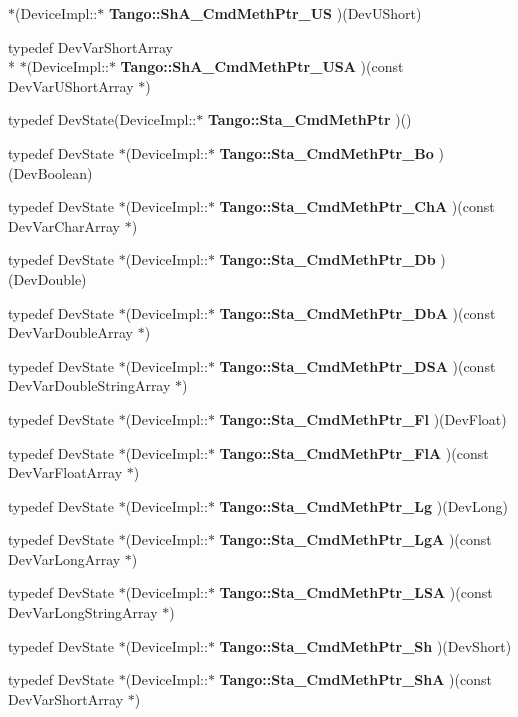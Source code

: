 \begin{DoxyCompactItemize}
$\ast$(Device\-Impl\-::$\ast$ {\bf Tango\-::\-Sh\-A\-\_\-\-Cmd\-Meth\-Ptr\-\_\-\-U\-S} )(Dev\-U\-Short)
\item 
typedef Dev\-Var\-Short\-Array \\*
$\ast$(Device\-Impl\-::$\ast$ {\bf Tango\-::\-Sh\-A\-\_\-\-Cmd\-Meth\-Ptr\-\_\-\-U\-S\-A} )(const Dev\-Var\-U\-Short\-Array $\ast$)
\item 
typedef Dev\-State(Device\-Impl\-::$\ast$ {\bf Tango\-::\-Sta\-\_\-\-Cmd\-Meth\-Ptr} )()
\item 
typedef Dev\-State $\ast$(Device\-Impl\-::$\ast$ {\bf Tango\-::\-Sta\-\_\-\-Cmd\-Meth\-Ptr\-\_\-\-Bo} )(Dev\-Boolean)
\item 
typedef Dev\-State $\ast$(Device\-Impl\-::$\ast$ {\bf Tango\-::\-Sta\-\_\-\-Cmd\-Meth\-Ptr\-\_\-\-Ch\-A} )(const Dev\-Var\-Char\-Array $\ast$)
\item 
typedef Dev\-State $\ast$(Device\-Impl\-::$\ast$ {\bf Tango\-::\-Sta\-\_\-\-Cmd\-Meth\-Ptr\-\_\-\-Db} )(Dev\-Double)
\item 
typedef Dev\-State $\ast$(Device\-Impl\-::$\ast$ {\bf Tango\-::\-Sta\-\_\-\-Cmd\-Meth\-Ptr\-\_\-\-Db\-A} )(const Dev\-Var\-Double\-Array $\ast$)
\item 
typedef Dev\-State $\ast$(Device\-Impl\-::$\ast$ {\bf Tango\-::\-Sta\-\_\-\-Cmd\-Meth\-Ptr\-\_\-\-D\-S\-A} )(const Dev\-Var\-Double\-String\-Array $\ast$)
\item 
typedef Dev\-State $\ast$(Device\-Impl\-::$\ast$ {\bf Tango\-::\-Sta\-\_\-\-Cmd\-Meth\-Ptr\-\_\-\-Fl} )(Dev\-Float)
\item 
typedef Dev\-State $\ast$(Device\-Impl\-::$\ast$ {\bf Tango\-::\-Sta\-\_\-\-Cmd\-Meth\-Ptr\-\_\-\-Fl\-A} )(const Dev\-Var\-Float\-Array $\ast$)
\item 
typedef Dev\-State $\ast$(Device\-Impl\-::$\ast$ {\bf Tango\-::\-Sta\-\_\-\-Cmd\-Meth\-Ptr\-\_\-\-Lg} )(Dev\-Long)
\item 
typedef Dev\-State $\ast$(Device\-Impl\-::$\ast$ {\bf Tango\-::\-Sta\-\_\-\-Cmd\-Meth\-Ptr\-\_\-\-Lg\-A} )(const Dev\-Var\-Long\-Array $\ast$)
\item 
typedef Dev\-State $\ast$(Device\-Impl\-::$\ast$ {\bf Tango\-::\-Sta\-\_\-\-Cmd\-Meth\-Ptr\-\_\-\-L\-S\-A} )(const Dev\-Var\-Long\-String\-Array $\ast$)
\item 
typedef Dev\-State $\ast$(Device\-Impl\-::$\ast$ {\bf Tango\-::\-Sta\-\_\-\-Cmd\-Meth\-Ptr\-\_\-\-Sh} )(Dev\-Short)
\item 
typedef Dev\-State $\ast$(Device\-Impl\-::$\ast$ {\bf Tango\-::\-Sta\-\_\-\-Cmd\-Meth\-Ptr\-\_\-\-Sh\-A} )(const Dev\-Var\-Short\-Array $\ast$)

\end{DoxyCompactItemize}
